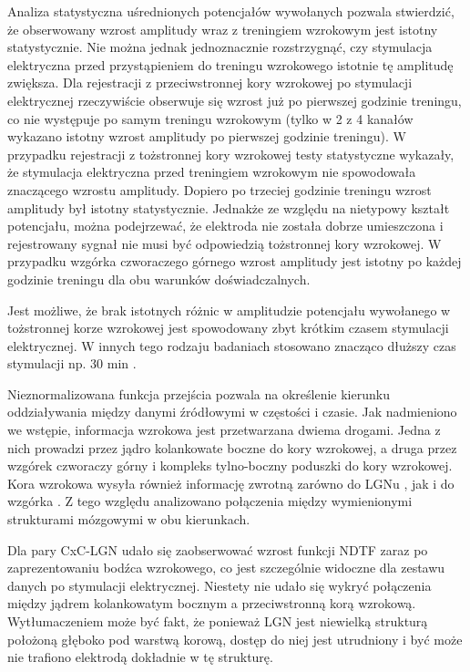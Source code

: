 \documentclass{pracamgr}
\begin{document}
	Analiza statystyczna uśrednionych potencjałów wywołanych pozwala stwierdzić, że obserwowany wzrost amplitudy wraz z treningiem wzrokowym jest istotny statystycznie. Nie można jednak jednoznacznie rozstrzygnąć, czy stymulacja elektryczna przed przystąpieniem do treningu wzrokowego istotnie tę amplitudę zwiększa. Dla rejestracji z przeciwstronnej kory wzrokowej po stymulacji elektrycznej rzeczywiście obserwuje się wzrost już po pierwszej godzinie treningu, co nie występuje po samym treningu wzrokowym (tylko w 2 z 4 kanałów wykazano istotny wzrost amplitudy po pierwszej godzinie treningu). W przypadku rejestracji z tożstronnej kory wzrokowej testy statystyczne wykazały, że stymulacja elektryczna przed treningiem wzrokowym nie spowodowała znaczącego wzrostu amplitudy. Dopiero po trzeciej godzinie treningu wzrost amplitudy był istotny statystycznie. Jednakże ze względu na nietypowy kształt potencjału, można podejrzewać, że elektroda nie została dobrze umieszczona i rejestrowany sygnał nie musi być odpowiedzią tożstronnej kory wzrokowej. W przypadku wzgórka czworaczego górnego wzrost amplitudy jest istotny po każdej godzinie treningu dla obu warunków doświadczalnych.
	
	Jest możliwe, że brak istotnych różnic w amplitudzie potencjału wywołanego w tożstronnej korze wzrokowej jest spowodowany zbyt krótkim czasem stymulacji elektrycznej. W innych tego rodzaju badaniach stosowano znacząco dłuższy czas stymulacji np. 30 min \citep{lazzaro}.
		
	Nieznormalizowana funkcja przejścia pozwala na określenie kierunku oddziaływania między danymi źródłowymi w częstości i czasie. Jak nadmieniono we wstępie, informacja wzrokowa jest przetwarzana dwiema drogami. Jedna z nich prowadzi przez jądro kolankowate boczne do kory wzrokowej, a druga przez wzgórek czworaczy górny i kompleks tylno-boczny poduszki do kory wzrokowej. Kora wzrokowa wysyła również informację zwrotną zarówno do LGNu \citep{viola2}, jak i do wzgórka \citep{viola}. Z tego względu analizowano połączenia między wymienionymi strukturami mózgowymi w obu kierunkach.
	
	Dla pary CxC-LGN udało się zaobserwować wzrost funkcji NDTF zaraz po zaprezentowaniu bodźca wzrokowego, co jest szczególnie widoczne dla zestawu danych po stymulacji elektrycznej. Niestety nie udało się wykryć połączenia między jądrem kolankowatym bocznym a przeciwstronną korą wzrokową. Wytłumaczeniem może być fakt, że ponieważ LGN jest niewielką strukturą położoną głęboko pod warstwą korową, dostęp do niej jest utrudniony i być może nie trafiono elektrodą dokładnie w tę strukturę.
	
\end{document}
